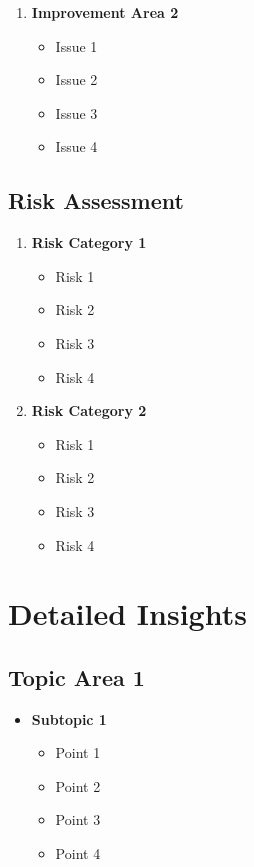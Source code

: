 \documentclass[10pt,a4paper]{article}
\begin{document}
\begin{multicols}{2}
\begin{enumerate}
  \item \textbf{Improvement Area 2}
    \begin{itemize}
      \item Issue 1
      \item Issue 2
      \item Issue 3
      \item Issue 4
    \end{itemize}
\end{enumerate}

\subsection*{Risk Assessment}
\begin{enumerate}\small
  \item \textbf{Risk Category 1}
    \begin{itemize}
      \item Risk 1
      \item Risk 2
      \item Risk 3
      \item Risk 4
    \end{itemize}
  
  \item \textbf{Risk Category 2}
    \begin{itemize}
      \item Risk 1
      \item Risk 2
      \item Risk 3
      \item Risk 4
    \end{itemize}
\end{enumerate}

\section*{Detailed Insights}
\subsection*{Topic Area 1}
\begin{itemize}\small
  \item \textbf{Subtopic 1}
    \begin{itemize}
      \item Point 1
      \item Point 2
      \item Point 3
      \item Point 4
    \end{itemize}
  

\end{itemize}
\end{multicols}
\end{document}
